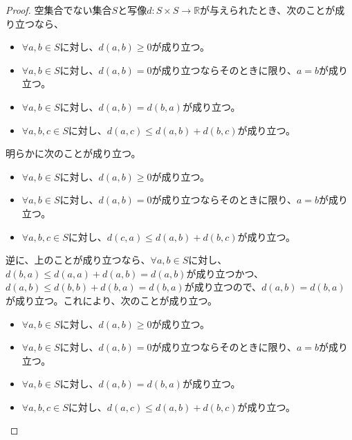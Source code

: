 \documentclass[dvipdfmx]{jsarticle}
\begin{document}
\begin{proof}
空集合でない集合$S$と写像$d:S \times S \rightarrow \mathbb{R}$が与えられたとき、次のことが成り立つなら、
\begin{itemize}
\item
  $\forall a,b \in S$に対し、$d(a,b) \geq 0$が成り立つ。
\item
  $\forall a,b \in S$に対し、$d(a,b) = 0$が成り立つならそのときに限り、$a = b$が成り立つ。
\item
  $\forall a,b \in S$に対し、$d(a,b) = d(b,a)$が成り立つ。
\item
  $\forall a,b,c \in S$に対し、$d(a,c) \leq d(a,b) + d(b,c)$が成り立つ。
\end{itemize}
明らかに次のことが成り立つ。
\begin{itemize}
\item
  $\forall a,b \in S$に対し、$d(a,b) \geq 0$が成り立つ。
\item
  $\forall a,b \in S$に対し、$d(a,b) = 0$が成り立つならそのときに限り、$a = b$が成り立つ。
\item
  $\forall a,b,c \in S$に対し、$d(c,a) \leq d(a,b) + d(b,c)$が成り立つ。
\end{itemize}\par
逆に、上のことが成り立つなら、$\forall a,b \in S$に対し、$d(b,a) \leq d(a,a) + d(a,b) = d(a,b)$が成り立つかつ、$d(a,b) \leq d(b,b) + d(b,a) = d(b,a)$が成り立つので、$d(a,b) = d(b,a)$が成り立つ。これにより、次のことが成り立つ。
\begin{itemize}
\item
  $\forall a,b \in S$に対し、$d(a,b) \geq 0$が成り立つ。
\item
  $\forall a,b \in S$に対し、$d(a,b) = 0$が成り立つならそのときに限り、$a = b$が成り立つ。
\item
  $\forall a,b \in S$に対し、$d(a,b) = d(b,a)$が成り立つ。
\item
  $\forall a,b,c \in S$に対し、$d(a,c) \leq d(a,b) + d(b,c)$が成り立つ。
\end{itemize}

\end{proof}
\end{document}
